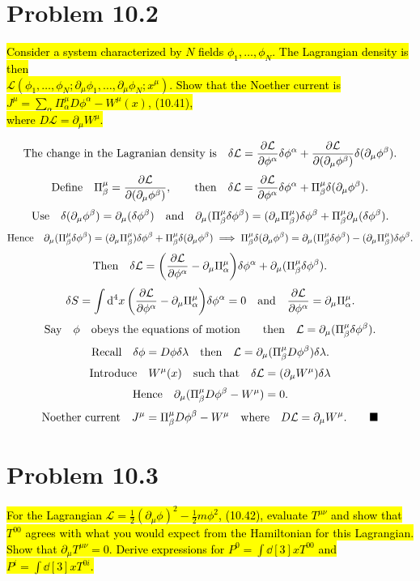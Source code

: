 \documentclass{article}
\begin{document}
\section*{Problem 10.2}
\begin{quoting}
    \hl{Consider a system characterized by $N$ fields $\phi_1,\dots,\phi_N$. The Lagrangian density is then\\ $\mathcal{L}(\phi_1,\dots,\phi_N;\partial_\mu \phi_1,\dots,\partial_\mu \phi_N;x^\mu)$. Show that the Noether current is $J^\mu=\sum_\alpha \Pi_\alpha^\mu  D\phi^\alpha-W^\mu(x)$, (10.41),\\ where $D\mathcal{L}=\partial_\mu W^\mu$.}
\end{quoting}

\[\qq*{The change in the Lagranian density is}\delta\mathcal{L}=\pdv{\mathcal{L}}{\phi^\alpha}\delta\phi^\alpha+\pdv{\mathcal{L}}{(\partial_\mu \phi^\beta)}\delta(\partial_\mu \phi^\beta).\]
\[\qq*{Define}\Pi^\mu_\beta=\pdv{\mathcal{L}}{(\partial_\mu \phi^\beta)}\qcomma \qthen \delta\mathcal{L}=\pdv{\mathcal{L}}{\phi^\alpha}\delta\phi^\alpha+\Pi^\mu_\beta \delta(\partial_\mu \phi^\beta).\]
\[\qq*{Use}\delta(\partial_\mu \phi^\beta)=\partial_\mu (\delta\phi^\beta)\qand\partial_\mu (\Pi^\mu_\beta \delta\phi^\beta)=(\partial_\mu \Pi^\mu_\beta) \delta\phi^\beta+\Pi^\mu_\beta \partial_\mu (\delta\phi^\beta).\]
\[\qq*{Hence}\partial_\mu (\Pi^\mu_\beta \delta\phi^\beta)=(\partial_\mu \Pi^\mu_\beta) \delta\phi^\beta+\Pi^\mu_\beta \delta(\partial_\mu \phi^\beta)\implies\Pi^\mu_\beta \delta(\partial_\mu \phi^\beta)=\partial_\mu (\Pi^\mu_\beta \delta\phi^\beta)-(\partial_\mu \Pi^\mu_\beta) \delta\phi^\beta.\]
\[\qq*{Then}\delta\mathcal{L}=\pqty{\pdv{\mathcal{L}}{\phi^\alpha}-\partial_\mu \Pi^\mu_\alpha}\delta\phi^\alpha+\partial_\mu (\Pi^\mu_\beta \delta\phi^\beta).\]
\[\delta S=\int\dd[4]{x}\pqty{\pdv{\mathcal{L}}{\phi^\alpha}-\partial_\mu \Pi^\mu_\alpha}\delta\phi^\alpha=0\qand\pdv{\mathcal{L}}{\phi^\alpha}=\partial_\mu \Pi^\mu_\alpha.\]
\[\qq*{Say}\phi\qq{obeys the equations of motion}\qthen \mathcal{L}=\partial_\mu (\Pi^\mu_\beta \delta\phi^\beta).\]
\[\qq*{Recall}\delta\phi=D\phi\delta\lambda\qthen\mathcal{L}=\partial_\mu (\Pi^\mu_\beta D\phi^\beta) \delta\lambda.\]
\[\qq*{Introduce}W^\mu(x)\qq{such that}\delta\mathcal{L}=(\partial_\mu W^\mu)\delta\lambda\]
\[\qq*{Hence}\partial_\mu (\Pi^\mu_\beta D\phi^\beta-W^\mu)=0.\]
\[\qq*{Noether current} J^\mu=\Pi^\mu_\beta D\phi^\beta-W^\mu\qq{where}D\mathcal{L}=\partial_\mu W^\mu.\qquad\blacksquare\]

\section*{Problem 10.3}
\begin{quoting}
    \hl{For the Lagrangian $\mathcal{L}=\frac{1}{2}(\partial_\mu \phi)^2-\frac{1}{2}m\phi^2$, (10.42), evaluate $T^{\mu\nu}$ and show that $T^{00}$ agrees with what you would expect from the Hamiltonian for this Lagrangian. Show that $\partial_\mu T^{\mu\nu}=0$. Derive expressions for $P^0=\int\dd[3]{x}T^{00}$ and $P^i=\int\dd[3]{x}T^{0i}$.}
\end{quoting}
\end{document}
